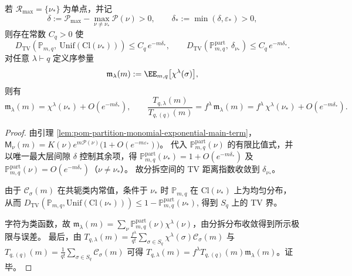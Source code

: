 \begin{theorem}[唯一主循环型下的冻结与通道序参量极限]\label{thm:pom-symmetric-group-gibbs-freezing}
若 \(\mathcal{R}_{\max}=\{\nu_*\}\) 为单点，并记
\[
\delta:=\mathcal{P}_{\max}-\max_{\nu\neq\nu_*}\mathcal{P}(\nu)>0,
\qquad
\delta_*:=\min(\delta,\varepsilon_*)>0,
\]
则存在常数 \(C_q>0\) 使
\[
D_{\mathrm{TV}}\!\left(\mathbb P_{m,q},\ \mathrm{Unif}(\mathrm{Cl}(\nu_*))\right)\le C_q\,e^{-m\delta_*},
\qquad
D_{\mathrm{TV}}\!\left(\mathbb P_{m,q}^{\mathrm{part}},\ \delta_{\nu_*}\right)\le C_q\,e^{-m\delta_*}.
\]
对任意 \(\lambda\vdash q\) 定义序参量
\[
\mathfrak m_\lambda(m):=\EE_{m,q}\bigl[\chi^\lambda(\sigma)\bigr],
\]
则有
\[
\mathfrak m_\lambda(m)=\chi^\lambda(\nu_*)+O(e^{-m\delta_*}),
\qquad
\frac{T_{q,\lambda}(m)}{T_{q,(q)}(m)}=f^\lambda\,\mathfrak m_\lambda(m)
=f^\lambda\,\chi^\lambda(\nu_*)+O(e^{-m\delta_*}).
\]
\end{theorem}
\begin{proof}
由引理 \ref{lem:pom-partition-monomial-exponential-main-term}，
\(
\mathsf{M}_\nu(m)=K(\nu)e^{m\mathcal{P}(\nu)}\bigl(1+O(e^{-m\varepsilon_*})\bigr)
\)。
代入 \(\mathbb P_{m,q}^{\mathrm{part}}(\nu)\) 的有限比值式，并以唯一最大层间隙 \(\delta\) 控制其余项，得
\(
\mathbb P_{m,q}^{\mathrm{part}}(\nu_*)=1+O(e^{-m\delta_*})
\)
及 \(\mathbb P_{m,q}^{\mathrm{part}}(\nu)=O(e^{-m\delta_*})\)（\(\nu\neq\nu_*\)）。
故分拆空间的 TV 距离指数收敛到 \(\delta_{\nu_*}\)。
\par
由于 \(\mathcal{C}_\sigma(m)\) 在共轭类内常值，条件于 \(\nu_*\) 时 \(\mathbb P_{m,q}\) 在 \(\mathrm{Cl}(\nu_*)\) 上为均匀分布，
从而
\(
D_{\mathrm{TV}}(\mathbb P_{m,q},\mathrm{Unif}(\mathrm{Cl}(\nu_*)))\le 1-\mathbb P_{m,q}^{\mathrm{part}}(\nu_*)
\),
得到 \(S_q\) 上的 TV 界。
\par
字符为类函数，故 \(\mathfrak m_\lambda(m)=\sum_{\nu}\mathbb P_{m,q}^{\mathrm{part}}(\nu)\chi^\lambda(\nu)\)，由分拆分布收敛得到所示极限与误差。
最后，由
\(
T_{q,\lambda}(m)=\frac{f^\lambda}{q!}\sum_{\sigma\in S_q}\chi^\lambda(\sigma)\mathcal{C}_\sigma(m)
\)
与
\(
T_{q,(q)}(m)=\frac{1}{q!}\sum_{\sigma\in S_q}\mathcal{C}_\sigma(m)
\)
可得 \(T_{q,\lambda}(m)=f^\lambda T_{q,(q)}(m)\mathfrak m_\lambda(m)\)。证毕。
\end{proof}

